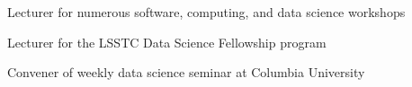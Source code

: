\documentclass[letterpaper,12pt]{deedy-resume}
\begin{document}
\begin{minipage}[t]{0.64\textwidth}




\begin{tightitemize}
    \item Lecturer for numerous software, computing, and data science workshops
    \item Lecturer for the LSSTC Data Science Fellowship program
    \item Convener of weekly data science seminar at Columbia University
\end{tightitemize}







\end{minipage} %
\end{document}

